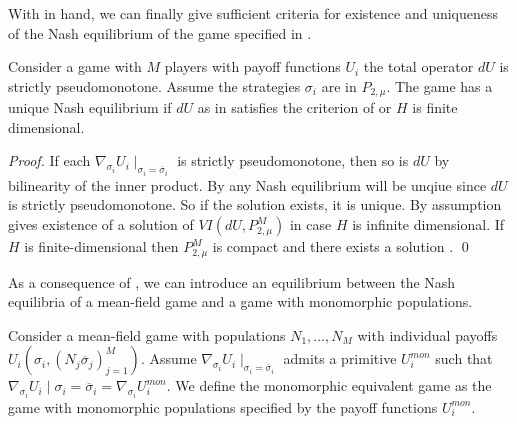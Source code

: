 With  in hand, we can finally give sufficient criteria for existence and uniqueness of the Nash equilibrium of the game specified in .
\begin{theorem} \label{thm:nash_unique}
  Consider a game with $M$ players with payoff functions $U_i$ the total operator $dU$ is strictly pseudomonotone. Assume the strategies $\sigma_i$ are in $P_{2,\mu}$. The game has a unique Nash equilibrium if $dU$ as in  satisfies the criterion of  or $H$ is finite dimensional.
\end{theorem}
\begin{proof}
   If each $\nabla_{\sigma_i} U_i \mid_{\sigma_i = \overbar{\sigma}_i}$ is strictly pseudomonotone, then so is $dU$ by bilinearity of the inner product. By  any Nash equilibrium will be unqiue since $dU$ is strictly pseudomonotone. So if the solution exists, it is unique. By assumption  gives existence of a solution of $VI(dU,P_{2,\mu}^M)$ in case $H$ is infinite dimensional. If $H$ is finite-dimensional then $P_{2,\mu}^M$ is compact and there exists a solution . \qed
\end{proof}
As a consequence of , we can introduce an equilibrium between the Nash equilibria of a mean-field game and a game with monomorphic populations.
\begin{definition}
  \label{def:correspondence}
  Consider a mean-field game with populations $N_1,\dots,N_M$ with individual payoffs $U_i(\sigma_i, (N_j \overbar{\sigma}_j)_{j=1}^M)$. Assume $\nabla_{\sigma_i}U_i\mid_{\sigma_i=\overbar{\sigma}_i}$ admits a primitive $U_i^{mon}$ such that $\nabla_{\sigma_i} U_i\mid{\sigma_i = \overbar{\sigma}_i} = \nabla_{\sigma_i} U_i^{mon}$.
   We define the monomorphic equivalent game as the game with monomorphic populations specified by the payoff functions $U_i^{mon}$.
\end{definition}
